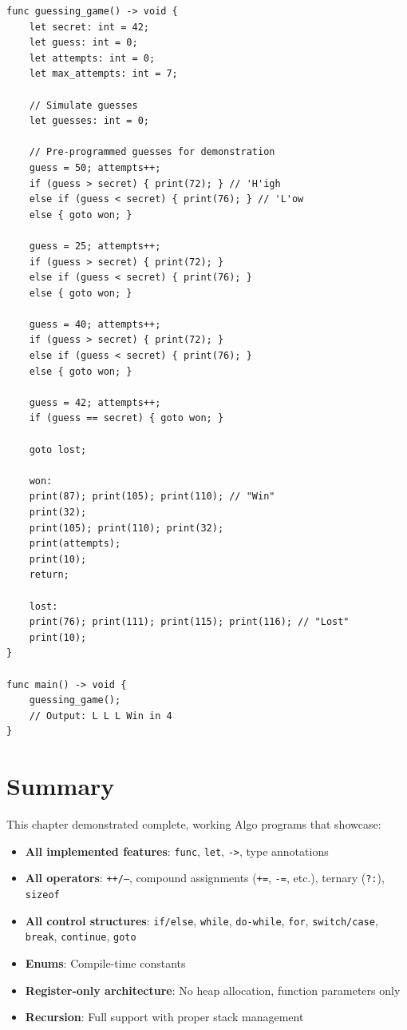 \documentclass[12pt,a4paper,oneside]{book}
\newcommand{\code}[1]{\texttt{#1}}
\begin{document}
\begin{lstlisting}[style=algo, caption={Interactive Guessing Game Simulation}]
func guessing_game() -> void {
    let secret: int = 42;
    let guess: int = 0;
    let attempts: int = 0;
    let max_attempts: int = 7;
    
    // Simulate guesses
    let guesses: int = 0;
    
    // Pre-programmed guesses for demonstration
    guess = 50; attempts++; 
    if (guess > secret) { print(72); } // 'H'igh
    else if (guess < secret) { print(76); } // 'L'ow
    else { goto won; }
    
    guess = 25; attempts++;
    if (guess > secret) { print(72); }
    else if (guess < secret) { print(76); }
    else { goto won; }
    
    guess = 40; attempts++;
    if (guess > secret) { print(72); }
    else if (guess < secret) { print(76); }
    else { goto won; }
    
    guess = 42; attempts++;
    if (guess == secret) { goto won; }
    
    goto lost;
    
    won:
    print(87); print(105); print(110); // "Win"
    print(32);
    print(105); print(110); print(32);
    print(attempts);
    print(10);
    return;
    
    lost:
    print(76); print(111); print(115); print(116); // "Lost"
    print(10);
}

func main() -> void {
    guessing_game();
    // Output: L L L Win in 4
}
\end{lstlisting}

\section{Summary}

This chapter demonstrated complete, working Algo programs that showcase:

\begin{itemize}
    \item \textbf{All implemented features}: \code{func}, \code{let}, \code{->}, type annotations
    \item \textbf{All operators}: \code{++/--}, compound assignments (\code{+=}, \code{-=}, etc.), ternary (\code{?:}), \code{sizeof}
    \item \textbf{All control structures}: \code{if/else}, \code{while}, \code{do-while}, \code{for}, \code{switch/case}, \code{break}, \code{continue}, \code{goto}
    \item \textbf{Enums}: Compile-time constants
    \item \textbf{Register-only architecture}: No heap allocation, function parameters only
    \item \textbf{Recursion}: Full support with proper stack management
\end{itemize}
\end{document}
